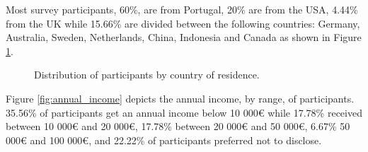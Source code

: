 Most survey participants, 60\%, are from Portugal, 20\% are from the USA,
4.44\% from the UK while 15.66\% are divided between the following countries:
Germany, Australia, Sweden, Netherlands, China, Indonesia and Canada as shown
in Figure \ref{fig:country}.

\begin{figure}[H]
    \begin{center}
        \caption{Distribution of participants by country of residence.}
        \label{fig:country}
    \end{center}
\end{figure}

Figure \ref{fig:annual_income} depicts the annual income, by range, of participants. 35.56\%
of participants get an annual income below 10 000\textup{\euro} while 17.78\% received
between 10 000\textup{\euro} and 20 000\textup{\euro}, 17.78\% between 20 000\textup{\euro}
and 50 000\textup{\euro}, 6.67\% 50 000\textup{\euro} and 100 000\textup{\euro},
and 22.22\% of participants preferred not to disclose.

